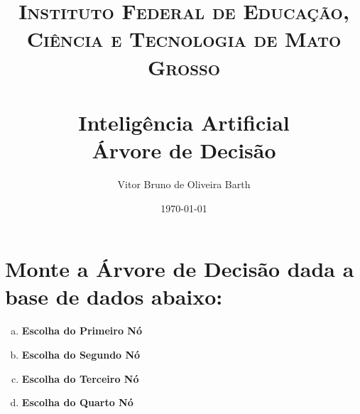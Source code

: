 \documentclass[paper=a4, fontsize=11pt]{scrartcl} %
\title{	
    \normalfont \normalsize 
    \textsc{Instituto Federal de Educação, Ciência e Tecnologia de Mato Grosso} \\ [25pt] %
    \horrule{0.5pt} \\[0.4cm] %
    \huge Inteligência Artificial \\ %
    \huge Árvore de Decisão
    \horrule{2pt} \\[0.5cm] %
    }
\author{Vitor Bruno de Oliveira Barth} %
\date{\normalsize\today} %
\begin{document}
    
    \maketitle
    
    
	\section{Monte a Árvore de Decisão dada a base de dados abaixo:}

	

	\begin{enumerate}[(a)]
        \item \textbf{Escolha do Primeiro Nó}
		\par 
		\vskip 0.3in
		\item \textbf{Escolha do Segundo Nó}
		
		\par 
		\vskip 0.3in
		\item \textbf{Escolha do Terceiro Nó}
		
		\par 
		\vskip 0.3in
		\item \textbf{Escolha do Quarto Nó}
		
        \par 
    \end{enumerate}




    
\end{document}
